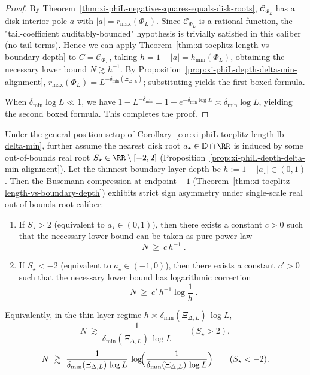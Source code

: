 \begin{proof}
By Theorem~\ref{thm:xi-phiL-negative-squares-equals-disk-roots}, \(\mathscr{C}_{\Phi_L}\) has a disk-interior pole \(a\) with \(|a|=r_{\max}(\Phi_L)\).
Since \(\mathscr{C}_{\Phi_L}\) is a rational function, the "tail-coefficient auditably-bounded" hypothesis is trivially satisfied in this caliber (no tail terms).
Hence we can apply Theorem~\ref{thm:xi-toeplitz-length-vs-boundary-depth} to \(C=\mathscr{C}_{\Phi_L}\), taking \(h=1-|a|=h_{\min}(\Phi_L)\), obtaining the necessary lower bound \(N\gtrsim h^{-1}\).
By Proposition~\ref{prop:xi-phiL-depth-delta-min-alignment}, \(r_{\max}(\Phi_L)=L^{-\delta_{\min}(\Xi_{\Delta,L})}\); substituting yields the first boxed formula.
\par
When \(\delta_{\min}\log L\ll 1\), we have \(1-L^{-\delta_{\min}}=1-e^{-\delta_{\min}\log L}\asymp \delta_{\min}\log L\), yielding the second boxed formula. This completes the proof.
\end{proof}

\begin{corollary}\label{cor:xi-phiL-endpoint-asymmetry-log-correction}
Under the general-position setup of Corollary~\ref{cor:xi-phiL-toeplitz-length-lb-delta-min}, further assume the nearest disk root \(a_\star\in\mathbb{D}\cap\RR\) is induced by some out-of-bounds real root \(S_\star\in\RR\setminus[-2,2]\) (Proposition~\ref{prop:xi-phiL-depth-delta-min-alignment}).
Let the thinnest boundary-layer depth be \(h:=1-|a_\star|\in(0,1)\).
Then the Busemann compression at endpoint \(-1\) (Theorem~\ref{thm:xi-toeplitz-length-vs-boundary-depth}) exhibits strict sign asymmetry under single-scale real out-of-bounds root caliber:
\begin{enumerate}
  \item If \(S_\star>2\) (equivalent to \(a_\star\in(0,1)\)), then there exists a constant \(c>0\) such that the necessary lower bound can be taken as pure power-law
  \[
  \boxed{\;
  N\ \ge\ c\,h^{-1}\; }.
  \]
  \item If \(S_\star<-2\) (equivalent to \(a_\star\in(-1,0)\)), then there exists a constant \(c'>0\) such that the necessary lower bound has logarithmic correction
  \[
  \boxed{\;
  N\ \ge\ c'\,h^{-1}\log\frac{1}{h}\; }.
  \]
\end{enumerate}
Equivalently, in the thin-layer regime \(h\asymp \delta_{\min}(\Xi_{\Delta,L})\,\log L\),
\[
N\ \gtrsim\ \frac{1}{\delta_{\min}(\Xi_{\Delta,L})\,\log L}\qquad(S_\star>2),
\]
\[
N\ \gtrsim\ \frac{1}{\delta_{\min}(\Xi_{\Delta,L})\,\log L}\,
\log\!\Bigl(\frac{1}{\delta_{\min}(\Xi_{\Delta,L})\,\log L}\Bigr)\qquad(S_\star<-2).
\]
\end{corollary}

